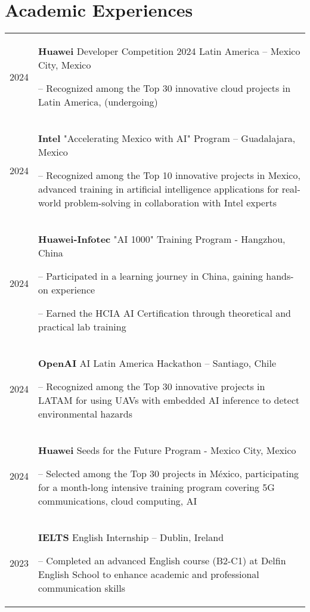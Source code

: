 \documentclass[a4paper,12pt]{article}
\begin{document}
\section{Academic Experiences}
\begin{tabularx}{\linewidth}{@{}l X@{}}	
2024 & \textbf{Huawei} Developer Competition 2024 Latin America – Mexico City, Mexico 
\item[--] Recognized among the Top 30 innovative cloud projects in Latin America, (undergoing)\hfill  \\

2024 & \textbf{Intel} "Accelerating Mexico with AI" Program – Guadalajara, Mexico 
\item[--] Recognized among the Top 10 innovative projects in Mexico, advanced training in artificial intelligence applications for real-world problem-solving in collaboration with Intel experts \hfill  \\

2024 & \textbf{Huawei-Infotec} "AI 1000" Training Program - Hangzhou, China 
\item[--] Participated in a learning journey in China, gaining hands-on experience
\item[--] Earned the HCIA AI Certification through theoretical and practical lab training \hfill \\

2024 & \textbf{OpenAI} AI Latin America Hackathon – Santiago, Chile 
\item[--] Recognized among the Top 30 innovative projects in LATAM for using UAVs with embedded AI inference to detect environmental hazards\hfill \\ 

2024 & \textbf{Huawei} Seeds for the Future Program - Mexico City, Mexico
\item[--] Selected among the Top 30 projects in México, participating for a month-long intensive training program covering 5G communications, cloud computing, AI\hfill \\

2023 & \textbf{IELTS} English Internship – Dublin, Ireland  
\item[--] Completed an advanced English course (B2-C1) at Delfin English School to enhance academic and professional communication skills\hfill \\


\end{tabularx}
\end{document}
